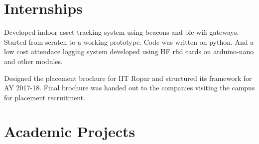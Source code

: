\documentclass[]{deedy-resume-openfont}
\begin{document}
\begin{minipage}[t]{0.33\textwidth}
%
%

\end{minipage} 
\hfill
\begin{minipage}[t]{0.62\textwidth} 


\section{Internships}
\vspace{\topsep} %
\begin{tightemize}
\item Developed indoor asset tracking system using beacons and ble-wifi gateways. Started from scratch to a working prototype. Code was written on python.
And a low cost attendace logging system developed using HF rfid cards on arduino-nano and other modules.
\end{tightemize}

\begin{tightemize}
\item Designed the placement brochure for IIT Ropar and structured its framework for AY 2017-18. Final brochure was handed out to the companies visiting the campus for placement recruitment. 
\end{tightemize}

\section{Academic Projects}


\end{minipage}
\end{document}
